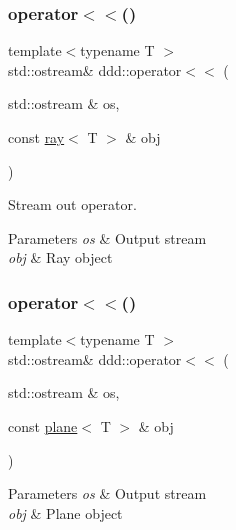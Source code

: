 \subsubsection{\texorpdfstring{operator$<$$<$()}{operator<<()}\hspace{0.1cm}{\footnotesize\ttfamily [8/10]}}
{\footnotesize\ttfamily template$<$typename T $>$ \\
std\+::ostream\& ddd\+::operator$<$$<$ (\begin{DoxyParamCaption}\item[{std\+::ostream \&}]{os,  }\item[{const \hyperlink{classddd_1_1ray}{ray}$<$ T $>$ \&}]{obj }\end{DoxyParamCaption})\hspace{0.3cm}{\ttfamily [inline]}}



Stream out operator. 


\begin{DoxyParams}{Parameters}
{\em os} & Output stream \\
\hline
{\em obj} & Ray object \\
\hline
\end{DoxyParams}
\mbox{\label{namespaceddd_af1faa02295670c7cfd7f0278e3973f84}} 
\subsubsection{\texorpdfstring{operator$<$$<$()}{operator<<()}\hspace{0.1cm}{\footnotesize\ttfamily [9/10]}}
{\footnotesize\ttfamily template$<$typename T $>$ \\
std\+::ostream\& ddd\+::operator$<$$<$ (\begin{DoxyParamCaption}\item[{std\+::ostream \&}]{os,  }\item[{const \hyperlink{classddd_1_1plane}{plane}$<$ T $>$ \&}]{obj }\end{DoxyParamCaption})\hspace{0.3cm}{\ttfamily [inline]}}


\begin{DoxyParams}{Parameters}
{\em os} & Output stream \\
\hline
{\em obj} & Plane object \\
\hline
\end{DoxyParams}
\mbox{\label{namespaceddd_a64dbb41c0ee377eb528907f3448514f6}} 
